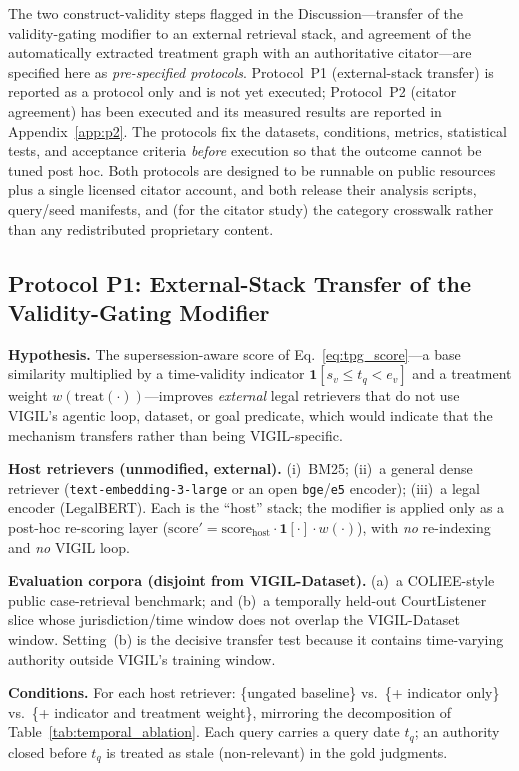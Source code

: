 The two construct-validity steps flagged in the Discussion---transfer of the validity-gating modifier to an external retrieval stack, and agreement of the automatically extracted treatment graph with an authoritative citator---are specified here as \emph{pre-specified protocols}. Protocol~P1 (external-stack transfer) is reported as a protocol only and is not yet executed; Protocol~P2 (citator agreement) has been executed and its measured results are reported in Appendix~\ref{app:p2}. The protocols fix the datasets, conditions, metrics, statistical tests, and acceptance criteria \emph{before} execution so that the outcome cannot be tuned post hoc. Both protocols are designed to be runnable on public resources plus a single licensed citator account, and both release their analysis scripts, query/seed manifests, and (for the citator study) the category crosswalk rather than any redistributed proprietary content.

\subsection{Protocol P1: External-Stack Transfer of the Validity-Gating Modifier}
\label{app:p1}

\textbf{Hypothesis.} The supersession-aware score of Eq.~\eqref{eq:tpg_score}---a base similarity multiplied by a time-validity indicator $\mathbf{1}[s_v\!\le\! t_q\!<\! e_v]$ and a treatment weight $w(\mathrm{treat}(\cdot))$---improves \emph{external} legal retrievers that do not use VIGIL's agentic loop, dataset, or goal predicate, which would indicate that the mechanism transfers rather than being VIGIL-specific.

\textbf{Host retrievers (unmodified, external).} (i)~BM25; (ii)~a general dense retriever (\texttt{text-embedding-3-large} or an open \texttt{bge}/\texttt{e5} encoder); (iii)~a legal encoder (LegalBERT). Each is the ``host'' stack; the modifier is applied only as a post-hoc re-scoring layer ($\mathrm{score}'=\mathrm{score}_{\text{host}}\cdot\mathbf{1}[\cdot]\cdot w(\cdot)$), with \emph{no} re-indexing and \emph{no} VIGIL loop.

\textbf{Evaluation corpora (disjoint from VIGIL-Dataset).} (a)~a COLIEE-style public case-retrieval benchmark; and (b)~a temporally held-out CourtListener slice whose jurisdiction/time window does not overlap the VIGIL-Dataset window. Setting~(b) is the decisive transfer test because it contains time-varying authority outside VIGIL's training window.

\textbf{Conditions.} For each host retriever: \{ungated baseline\} vs.\ \{+ indicator only\} vs.\ \{+ indicator and treatment weight\}, mirroring the decomposition of Table~\ref{tab:temporal_ablation}. Each query carries a query date $t_q$; an authority closed before $t_q$ is treated as stale (non-relevant) in the gold judgments.

